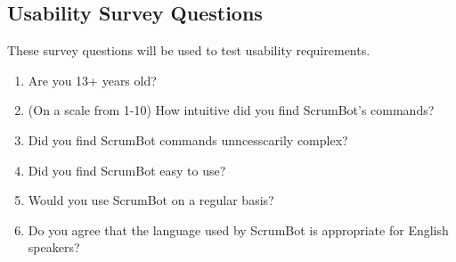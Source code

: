 \documentclass[12pt, titlepage]{article}
\begin{document}
\subsection{Usability Survey Questions}
These survey questions will be used to test usability requirements.
\begin{enumerate}
    \item Are you 13+ years old?
    \item (On a scale from 1-10) How intuitive did you find ScrumBot's commands?
    \item Did you find ScrumBot commands unncesscarily complex?
    \item Did you find ScrumBot easy to use?
    \item Would you use ScrumBot on a regular basis?
    \item Do you agree that the language used by ScrumBot is appropriate for English speakers?
\end{enumerate}
\end{document}
